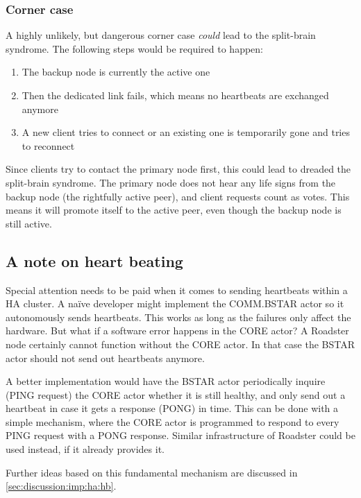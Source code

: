 \subsubsection{Corner case}
A highly unlikely, but dangerous corner case \emph{could} lead to the
split-brain syndrome. The following steps would be required to happen:

\begin{enumerate}
	\item The backup node is currently the active one

	\item Then the dedicated link fails, which means no heartbeats are
		exchanged anymore

	\item A new client tries to connect or an existing one is temporarily
		gone and tries to reconnect
\end{enumerate}

Since clients try to contact the primary node first, this could
lead to dreaded the split-brain syndrome. The primary node does not hear any
life signs from the backup node (the rightfully active peer), and client
requests count as votes. This means it will promote itself to the active peer,
even though the backup node is still active.

\subsection{A note on heart beating}\label{sec:approach:ha:hb}
Special attention needs to be paid when it comes to sending heartbeats within a
HA cluster. A na\"ive developer might implement the COMM.BSTAR actor so it
autonomously sends heartbeats. This works as long as the failures only affect
the hardware. But what if a software error happens in the CORE actor?  A
Roadster node certainly cannot function without the CORE actor. In that case the
BSTAR actor should not send out heartbeats anymore.

A better implementation would have the BSTAR actor periodically inquire (PING
request) the CORE actor whether it is still healthy, and only send out a
heartbeat in case it gets a response (PONG) in time. This can be done with a
simple mechanism, where the CORE actor is programmed to respond to every PING
request with a PONG response. Similar infrastructure of Roadster could be used
instead, if it already provides it.

Further ideas based on this fundamental mechanism are discussed in
\autoref{sec:discussion:imp:ha:hb}.

